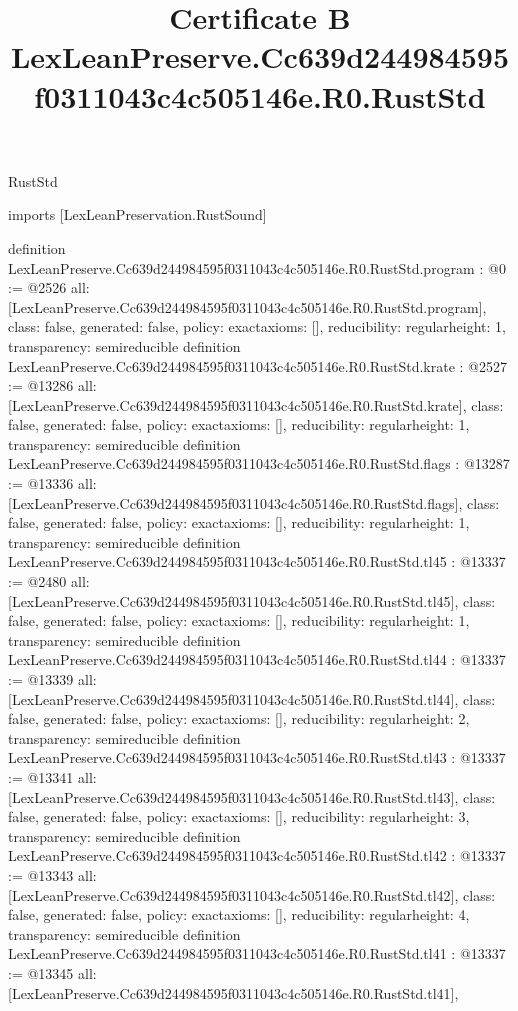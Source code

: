 \begin{lexlean}{RustStd}
\title{Certificate B LexLeanPreserve.Cc639d244984595f0311043c4c505146e.R0.RustStd}
\begin{coremodule}
imports [LexLeanPreservation.RustSound]

definition LexLeanPreserve.Cc639d244984595f0311043c4c505146e.R0.RustStd.program : @0 := @2526 {
  all: [LexLeanPreserve.Cc639d244984595f0311043c4c505146e.R0.RustStd.program],
  class: false,
  generated: false,
  policy: exact{axioms: []},
  reducibility: regular{height: 1},
  transparency: semireducible
}
definition LexLeanPreserve.Cc639d244984595f0311043c4c505146e.R0.RustStd.krate : @2527 := @13286 {
  all: [LexLeanPreserve.Cc639d244984595f0311043c4c505146e.R0.RustStd.krate],
  class: false,
  generated: false,
  policy: exact{axioms: []},
  reducibility: regular{height: 1},
  transparency: semireducible
}
definition LexLeanPreserve.Cc639d244984595f0311043c4c505146e.R0.RustStd.flags : @13287 := @13336 {
  all: [LexLeanPreserve.Cc639d244984595f0311043c4c505146e.R0.RustStd.flags],
  class: false,
  generated: false,
  policy: exact{axioms: []},
  reducibility: regular{height: 1},
  transparency: semireducible
}
definition LexLeanPreserve.Cc639d244984595f0311043c4c505146e.R0.RustStd.tl45 : @13337 := @2480 {
  all: [LexLeanPreserve.Cc639d244984595f0311043c4c505146e.R0.RustStd.tl45],
  class: false,
  generated: false,
  policy: exact{axioms: []},
  reducibility: regular{height: 1},
  transparency: semireducible
}
definition LexLeanPreserve.Cc639d244984595f0311043c4c505146e.R0.RustStd.tl44 : @13337 := @13339 {
  all: [LexLeanPreserve.Cc639d244984595f0311043c4c505146e.R0.RustStd.tl44],
  class: false,
  generated: false,
  policy: exact{axioms: []},
  reducibility: regular{height: 2},
  transparency: semireducible
}
definition LexLeanPreserve.Cc639d244984595f0311043c4c505146e.R0.RustStd.tl43 : @13337 := @13341 {
  all: [LexLeanPreserve.Cc639d244984595f0311043c4c505146e.R0.RustStd.tl43],
  class: false,
  generated: false,
  policy: exact{axioms: []},
  reducibility: regular{height: 3},
  transparency: semireducible
}
definition LexLeanPreserve.Cc639d244984595f0311043c4c505146e.R0.RustStd.tl42 : @13337 := @13343 {
  all: [LexLeanPreserve.Cc639d244984595f0311043c4c505146e.R0.RustStd.tl42],
  class: false,
  generated: false,
  policy: exact{axioms: []},
  reducibility: regular{height: 4},
  transparency: semireducible
}
definition LexLeanPreserve.Cc639d244984595f0311043c4c505146e.R0.RustStd.tl41 : @13337 := @13345 {
  all: [LexLeanPreserve.Cc639d244984595f0311043c4c505146e.R0.RustStd.tl41],
}
\end{coremodule}
\end{lexlean}

